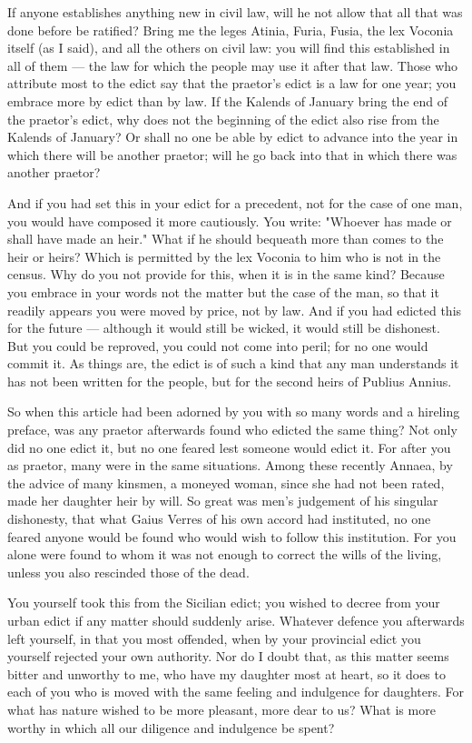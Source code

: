  If anyone establishes anything new in civil law, will he not allow that all that was done before be ratified? Bring me the leges Atinia, Furia, Fusia, the lex Voconia itself (as I said), and all the others on civil law: you will find this established in all of them --- the law for which the people may use it after that law. Those who attribute most to the edict say that the praetor's edict is a law for one year; you embrace more by edict than by law. If the Kalends of January bring the end of the praetor's edict, why does not the beginning of the edict also rise from the Kalends of January? Or shall no one be able by edict to advance into the year in which there will be another praetor; will he go back into that in which there was another praetor?

 And if you had set this in your edict for a precedent, not for the case of one man, you would have composed it more cautiously. You write: "Whoever has made or shall have made an heir." What if he should bequeath more than comes to the heir or heirs? Which is permitted by the lex Voconia to him who is not in the census. Why do you not provide for this, when it is in the same kind? Because you embrace in your words not the matter but the case of the man, so that it readily appears you were moved by price, not by law. And if you had edicted this for the future --- although it would still be wicked, it would still be dishonest. But you could be reproved, you could not come into peril; for no one would commit it. As things are, the edict is of such a kind that any man understands it has not been written for the people, but for the second heirs of Publius Annius.

 So when this article had been adorned by you with so many words and a hireling preface, was any praetor afterwards found who edicted the same thing? Not only did no one edict it, but no one feared lest someone would edict it. For after you as praetor, many were in the same situations. Among these recently Annaea, by the advice of many kinsmen, a moneyed woman, since she had not been rated, made her daughter heir by will. So great was men's judgement of his singular dishonesty, that what Gaius Verres of his own accord had instituted, no one feared anyone would be found who would wish to follow this institution. For you alone were found to whom it was not enough to correct the wills of the living, unless you also rescinded those of the dead.

 You yourself took this from the Sicilian edict; you wished to decree from your urban edict if any matter should suddenly arise. Whatever defence you afterwards left yourself, in that you most offended, when by your provincial edict you yourself rejected your own authority. Nor do I doubt that, as this matter seems bitter and unworthy to me, who have my daughter most at heart, so it does to each of you who is moved with the same feeling and indulgence for daughters. For what has nature wished to be more pleasant, more dear to us? What is more worthy in which all our diligence and indulgence be spent?

